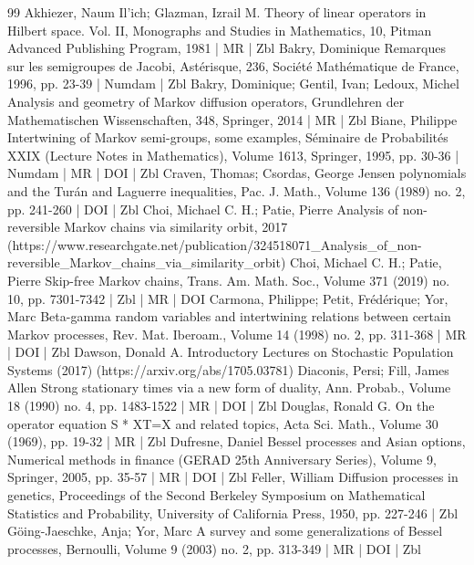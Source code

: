 \begin{thebibliography}{99}
Akhiezer, Naum Il’ich; Glazman, Izrail M. Theory of linear operators in Hilbert space. Vol. II, Monographs and Studies in Mathematics, 10, Pitman Advanced Publishing Program, 1981 | MR | Zbl
Bakry, Dominique Remarques sur les semigroupes de Jacobi, Astérisque, 236, Société Mathématique de France, 1996, pp. 23-39 | Numdam | Zbl
Bakry, Dominique; Gentil, Ivan; Ledoux, Michel Analysis and geometry of Markov diffusion operators, Grundlehren der Mathematischen Wissenschaften, 348, Springer, 2014 | MR | Zbl
Biane, Philippe Intertwining of Markov semi-groups, some examples, Séminaire de Probabilités XXIX (Lecture Notes in Mathematics), Volume 1613, Springer, 1995, pp. 30-36 | Numdam | MR | DOI | Zbl
Craven, Thomas; Csordas, George Jensen polynomials and the Turán and Laguerre inequalities, Pac. J. Math., Volume 136 (1989) no. 2, pp. 241-260 | DOI | Zbl
Choi, Michael C. H.; Patie, Pierre Analysis of non-reversible Markov chains via similarity orbit, 2017 (https://www.researchgate.net/publication/324518071\_Analysis\_of\_non-reversible\_Markov\_chains\_via\_similarity\_orbit)
Choi, Michael C. H.; Patie, Pierre Skip-free Markov chains, Trans. Am. Math. Soc., Volume 371 (2019) no. 10, pp. 7301-7342 | Zbl | MR | DOI
Carmona, Philippe; Petit, Frédérique; Yor, Marc Beta-gamma random variables and intertwining relations between certain Markov processes, Rev. Mat. Iberoam., Volume 14 (1998) no. 2, pp. 311-368 | MR | DOI | Zbl
Dawson, Donald A. Introductory Lectures on Stochastic Population Systems (2017) (https://arxiv.org/abs/1705.03781)
Diaconis, Persi; Fill, James Allen Strong stationary times via a new form of duality, Ann. Probab., Volume 18 (1990) no. 4, pp. 1483-1522 | MR | DOI | Zbl
Douglas, Ronald G. On the operator equation S * XT=X and related topics, Acta Sci. Math., Volume 30 (1969), pp. 19-32 | MR | Zbl
Dufresne, Daniel Bessel processes and Asian options, Numerical methods in finance (GERAD 25th Anniversary Series), Volume 9, Springer, 2005, pp. 35-57 | MR | DOI | Zbl
Feller, William Diffusion processes in genetics, Proceedings of the Second Berkeley Symposium on Mathematical Statistics and Probability, University of California Press, 1950, pp. 227-246 | Zbl
Göing-Jaeschke, Anja; Yor, Marc A survey and some generalizations of Bessel processes, Bernoulli, Volume 9 (2003) no. 2, pp. 313-349 | MR | DOI | Zbl

\end{thebibliography}

